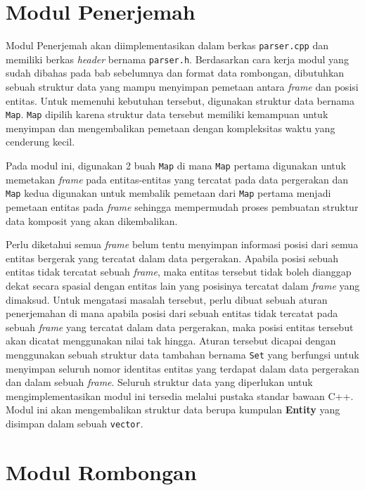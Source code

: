 \section{Modul Penerjemah}
\label{sec:impl-parser}

Modul Penerjemah akan diimplementasikan dalam berkas \texttt{parser.cpp} dan memiliki berkas \textit{header} bernama \texttt{parser.h}. Berdasarkan cara kerja modul yang sudah dibahas pada bab sebelumnya dan format data rombongan, dibutuhkan sebuah struktur data yang mampu menyimpan pemetaan antara \textit{frame} dan posisi entitas. Untuk memenuhi kebutuhan tersebut, digunakan struktur data bernama \texttt{Map}. \texttt{Map} dipilih karena struktur data tersebut memiliki kemampuan untuk menyimpan dan mengembalikan pemetaan dengan kompleksitas waktu yang cenderung kecil.

Pada modul ini, digunakan 2 buah \texttt{Map} di mana \texttt{Map} pertama digunakan untuk memetakan \textit{frame} pada entitas-entitas yang tercatat pada data pergerakan dan \texttt{Map} kedua digunakan untuk membalik pemetaan dari \texttt{Map} pertama menjadi pemetaan entitas pada \textit{frame} sehingga mempermudah proses pembuatan struktur data komposit yang akan dikembalikan. 

Perlu diketahui semua \textit{frame} belum tentu menyimpan informasi posisi dari semua entitas bergerak yang tercatat dalam data pergerakan. Apabila posisi sebuah entitas tidak tercatat sebuah \textit{frame}, maka entitas tersebut tidak boleh dianggap dekat secara spasial dengan entitas lain yang posisinya tercatat dalam \textit{frame} yang dimaksud. Untuk mengatasi masalah tersebut, perlu dibuat sebuah aturan penerjemahan di mana apabila posisi dari sebuah entitas tidak tercatat pada sebuah \textit{frame} yang tercatat dalam data pergerakan, maka posisi entitas tersebut akan dicatat menggunakan nilai tak hingga. Aturan tersebut dicapai dengan menggunakan sebuah struktur data tambahan bernama \texttt{Set} yang berfungsi untuk menyimpan seluruh nomor identitas entitas yang terdapat dalam data pergerakan dan dalam sebuah \textit{frame}. Seluruh struktur data yang diperlukan untuk mengimplementasikan modul ini tersedia melalui pustaka standar bawaan C++. Modul ini akan mengembalikan struktur data berupa kumpulan \textbf{Entity} yang disimpan dalam sebuah \texttt{vector}.

\section{Modul Rombongan}
\label{sec:impl-rombongan}

